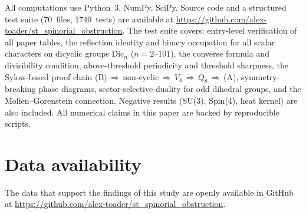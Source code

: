 \documentclass[12pt]{article}
\theoremstyle{definition}
\theoremstyle{remark}
\begin{document}
All computations use Python~3, NumPy, SciPy. Source code and a
structured test suite (70~files, 1740~tests) are available at
\url{https://github.com/alex-toader/st_spinorial_obstruction}.
The test suite covers: entry-level verification of all paper tables,
the reflection identity and binary occupation for all scalar characters
on dicyclic groups $\mathrm{Dic}_n$ ($n = 2$--$101$), the converse
formula and divisibility condition, above-threshold periodicity
and threshold sharpness, the Sylow-based proof chain
(B)$\,\Rightarrow\,$non-cyclic$\,\Rightarrow\,V_4\,\Rightarrow\,Q_8\,\Rightarrow\,$(A),
symmetry-breaking phase diagrams, sector-selective duality for odd
dihedral groups, and the Molien--Gorenstein connection.
Negative results (SU(3), Spin(4), heat kernel) are also included.
All numerical claims in this paper are backed by reproducible scripts.

\section*{Data availability}

The data that support the findings of this study are
openly available in GitHub at
\url{https://github.com/alex-toader/st_spinorial_obstruction}.
\end{document}
